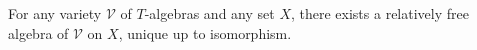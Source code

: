 For any variety $\mathcal{V}$ of $T$-algebras and any set $X$, there exists a relatively free algebra of $\mathcal{V}$ on $X$, unique up to isomorphism.
